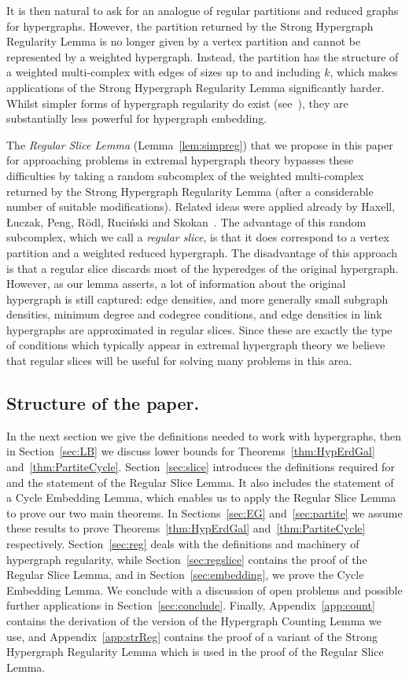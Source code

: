 \documentclass[12pt,a4paper]{amsart}
\begin{document}
It is then natural to ask for an analogue of regular partitions and reduced
graphs for hypergraphs. However, the partition returned by the Strong
Hypergraph Regularity Lemma is no longer given by a vertex partition and cannot be represented
by a weighted hypergraph.  Instead, the partition has the structure of a
weighted multi-complex with edges of sizes up to and including $k$, which
makes applications of the Strong Hypergraph Regularity Lemma significantly
harder. Whilst simpler forms of hypergraph regularity do exist
(see~\cite{WeakReg,WeakCount}), they are substantially less powerful
for hypergraph embedding.

The \emph{Regular Slice Lemma} (Lemma~\ref{lem:simpreg}) that we propose in
this paper for approaching problems in extremal hypergraph theory bypasses
these difficulties by taking a random subcomplex of the weighted
multi-complex returned by the Strong Hypergraph Regularity Lemma (after a
considerable number of suitable modifications). Related ideas were applied
already by Haxell, {\L}uczak, Peng, R{\"o}dl, Ruci{\'n}ski and
Skokan~\cite{3CycleRamsey}. The advantage of this random subcomplex, which we call a \emph{regular slice}, is that it does correspond to a vertex partition and a weighted reduced hypergraph. The disadvantage of this
approach is that a regular slice discards most of the hyperedges of the
original hypergraph. However, as our lemma asserts, a lot of information
about the original hypergraph is still captured: edge densities, and more
generally small subgraph densities, minimum degree and codegree conditions,
and edge densities in link hypergraphs are approximated in regular
slices. Since these are exactly the type of conditions which typically
appear in extremal hypergraph theory we believe that regular slices will be
useful for solving many problems in this area.

\subsection{Structure of the paper.} 
In the next section we give the definitions needed to work with hypergraphs,
then in Section~\ref{sec:LB} we discuss lower bounds for
Theorems~\ref{thm:HypErdGal} and~\ref{thm:PartiteCycle}.
Section~\ref{sec:slice} introduces the definitions required for and the statement of the Regular Slice Lemma. It also includes the statement of a Cycle Embedding Lemma, which enables us to apply the Regular Slice Lemma to prove our two main theorems.
In Sections~\ref{sec:EG} and~\ref{sec:partite} we assume these results to prove
Theorems~\ref{thm:HypErdGal} and~\ref{thm:PartiteCycle} respectively.
Section~\ref{sec:reg} deals with the definitions and machinery of hypergraph
regularity, while Section~\ref{sec:regslice} contains the proof of the Regular Slice Lemma, and in Section~\ref{sec:embedding}, we prove the Cycle Embedding Lemma. We
conclude with a discussion of open problems and possible further applications in
Section~\ref{sec:conclude}.
Finally, Appendix~\ref{app:count} contains the derivation of the version of the Hypergraph Counting Lemma we use, and Appendix~\ref{app:strReg} contains the proof of a variant of the Strong Hypergraph Regularity Lemma which is used in the proof of the Regular Slice Lemma.
\end{document}
